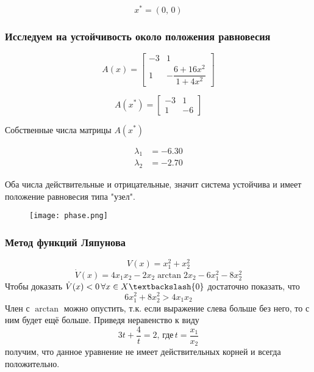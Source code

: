     \[x^* = (0,\,0)\]

    \subsubsection*{Исследуем на устойчивость около положения равновесия}
    \begin{equation*}
        A(x) =
        \begin{bmatrix}
            -3& 1\\
            1& -\dfrac{6 + 16x^2}{1 + 4x^2}
        \end{bmatrix}
    \end{equation*}

    \begin{equation*}
        A(x^*) =
        \begin{bmatrix}
            -3& 1\\
            1& -6
        \end{bmatrix}
    \end{equation*}

    Собственные числа матрицы $A(x^*)$

    \begin{equation*}
        \begin{aligned}
            \lambda_1 &= -6.30 \\
            \lambda_2 &= -2.70
        \end{aligned}
    \end{equation*}

    Оба числа действительные и отрицательные, значит система устойчива и имеет положение равновесия типа "узел".

    \begin{figure}[H]
        \centering
        \texttt{[image: phase.png]}
        \caption{}
    \end{figure}

    \subsubsection*{Метод функций Ляпунова}
    \[V(x) = x_1^2 + x_2^2\]
    \[\dot{V}(x) = 4x_1 x_2 - 2x_2\arctan{2x_2} - 6x_1^2 - 8x_2^2\]
    Чтобы доказать $\dot{V}(x) < 0\, \forall x \in X \textbackslash\{0\}$ достаточно показать, что
    \[6x_1^2 + 8x_2^2 > 4x_1 x_2\]
    Член с $\arctan$ можно опустить, т.к. если выражение слева больше без него, то с ним будет ещё больше.
    Приведя неравенство к виду \[3t + \dfrac{4}{t} = 2,\,\mbox{где}\,t = \dfrac{x_1}{x_2}\] получим, что данное уравнение не
    имеет действительных корней и всегда положительно.

